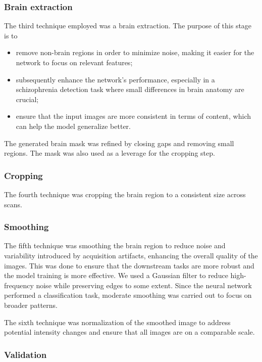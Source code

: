 \subsubsection{Brain extraction}

The third technique employed was a brain extraction. The purpose of this stage is to
\begin{itemize}
    \item remove non-brain regions in order to minimize noise, making it easier for the network to focus on relevant features;
    \item subsequently enhance the network's performance, especially in a schizophrenia detection task where small differences in brain anatomy are crucial;
    \item ensure that the input images are more consistent in terms of content, which can help the model generalize better.
\end{itemize}

The generated brain mask was refined by closing gaps and removing small regions. The mask was also used as a leverage for the cropping step.

\subsubsection{Cropping}

The fourth technique was cropping the brain region to a consistent size across scans.

\subsubsection{Smoothing}

The fifth technique was smoothing the brain region to reduce noise and variability introduced by acquisition artifacts, enhancing the overall quality of the images. This was done to ensure that the downstream tasks are more robust and the model training is more effective. We used a Gaussian filter to reduce high-frequency noise while preserving edges to some extent. Since the neural network performed a classification task, moderate smoothing was carried out to focus on broader patterns.

The sixth technique was normalization of the smoothed image to address potential intensity changes and ensure that all images are on a comparable scale.

\subsubsection{Validation}

